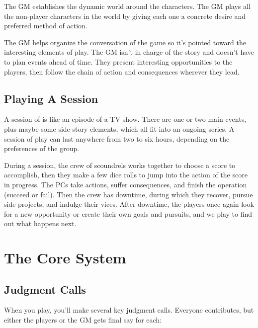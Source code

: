 \documentclass[11pt,fleqn,a5paper]{book}
\begin{document}
The GM establishes the dynamic world around the characters. The GM plays all the non-player characters in the world by giving each one a concrete desire and preferred method of action.

The GM helps organize the conversation of the game so it’s pointed toward the interesting elements of play. The GM isn’t in charge of the story and doesn’t have to plan events ahead of time. They present interesting opportunities to the players, then follow the chain of action and consequences wherever they lead.

\section{Playing A Session}

A session of \thetitle{} is like an episode of a TV show. There are one or two main events, plus maybe some side-story elements, which all fit into an ongoing series. A session of play can last anywhere from two to six hours, depending on the preferences of the group.

During a session, the crew of scoundrels works together to choose a score to accomplish, then they make a few dice rolls to jump into the action of the score in progress. The PCs take actions, suffer consequences, and finish the operation (succeed or fail). Then the crew has downtime, during which they recover, pursue side-projects, and indulge their vices. After downtime, the players once again look for a new opportunity or create their own goals and pursuits, and we play to find out what happens next.

\chapter{The Core System}

\section{Judgment Calls}

When you play, you’ll make several key judgment calls. Everyone contributes, but either the players or the GM gets final say for each:
\end{document}
